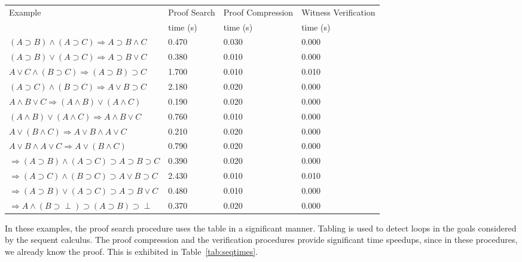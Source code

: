 \documentclass{llncs}
\begin{document}
\begin{table*}[htbp]
\begin{center}
\begin{small}
\begin{tabular}{|l|l|l|l|}
\hline
Example & Proof Search & Proof Compression & Witness Verification \\
& time (s) & time (s) & time (s)\\
\hline
$(A\supset B)\wedge (A\supset C)\Rightarrow A\supset B\wedge C$
&       0.470 
&       0.030 
&       0.000 \\
$(A\supset B)\vee (A\supset C)\Rightarrow A\supset B\vee C$
&       0.380 
&       0.010 
&       0.000 \\
$A\vee C\wedge (B\supset C)\Rightarrow (A\supset B)\supset C$
&       1.700 
&       0.010 
&       0.010 \\
$(A\supset C)\wedge (B\supset C)\Rightarrow A\vee B\supset C$
&       2.180 
&       0.020 
&       0.000 \\
$A\wedge B\vee C\Rightarrow (A\wedge B)\vee (A\wedge C)$
&       0.190 
&       0.020 
&       0.000 \\
$(A\wedge B)\vee (A\wedge C)\Rightarrow A\wedge B\vee C$
&       0.760 
&       0.010 
&       0.000 \\
$A\vee (B\wedge C)\Rightarrow A\vee B\wedge A\vee C$
&       0.210 
&       0.020 
&       0.000 \\
$A\vee B\wedge A\vee C\Rightarrow A\vee (B\wedge C)$
&       0.790 
&       0.020 
&       0.000 \\
$\Rightarrow (A\supset B)\wedge (A\supset C)\supset A\supset B\supset C$
&       0.390 
&       0.020 
&       0.000 \\
$\Rightarrow (A\supset C)\wedge (B\supset C)\supset A\vee B\supset C$
&       2.430 
&       0.010 
&       0.010 \\
$\Rightarrow (A\supset B)\vee (A\supset C)\supset A\supset B\vee C$
&       0.480 
&       0.010 
&       0.000 \\
$\Rightarrow A\wedge (B\supset \perp)\supset (A\supset B)\supset \perp$ 
&       0.370 
&       0.020 
&       0.000 \\
\hline
\end{tabular}
\end{small}
\end{center}
\caption{\label{tab:seqtimes}
Sequent Calculus: Times with Caching of User-Selected Predicates}
\end{table*}

In these examples, the proof search procedure uses the table in a significant
manner. Tabling is used to detect loops in the goals considered by the
sequent calculus. The proof compression and the verification procedures
provide significant time speedups, since in these procedures, we already
know the proof. This is exhibited in Table~\ref{tab:seqtimes}.
\end{document}
